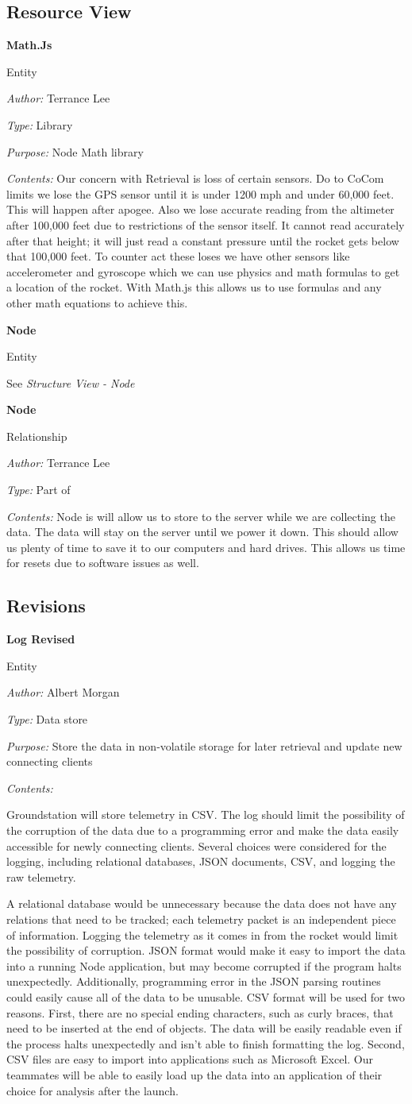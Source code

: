 \documentclass[10pt,draftclsnofoot,onecolumn]{IEEEtran}
\newcommand{\newentity}[5]{

	\noindent\textbf{#2}
	
	\noindent Entity
	
	\noindent\textit{Author:} {#1}
		
	\noindent\textit{Type:} {#3}
	
	\noindent\textit{Purpose:} {#4}

	\noindent\textit{Contents:} {#5}
	\vspace{.5cm}

}
\newcommand{\newrelationship}[4]{
	\noindent\textbf{#2}
	
	\noindent Relationship
	
	\noindent\textit{Author:} #1

	\noindent\textit{Type:} #3

	\noindent\textit{Contents:} #4

	\vspace{.5cm}
}
\newcommand{\entityref}[2]{

	\noindent\textbf{#1}
	
	\noindent Entity
	
	\noindent See \textit{#2}

	\vspace{.5cm}
}
\begin{document}
	\subsection{Resource View}
    
     
   \newentity
	{Terrance Lee}
	{Math.Js}
	{Library}
	{Node Math library}
	{Our concern with Retrieval is loss of certain sensors.  Do to CoCom limits we lose the GPS sensor until it is under 1200 mph and under 60,000 feet. This will happen after apogee.  Also we lose accurate reading from the altimeter after 100,000 feet due to restrictions of the sensor itself.  It cannot read accurately after that height; it will just read a constant pressure until the rocket gets below that 100,000 feet. To counter act these loses we have other sensors like accelerometer and gyroscope which we can use physics and math formulas to get a location of the rocket.  With Math.js this allows us to use formulas and any other math equations to achieve this. }
     \entityref{Node}
	{Structure View - Node}
    
    \newrelationship
	{Terrance Lee}
	{Node}
	{Part of}
	{	Node is will allow us to store to the server while we are collecting the data. The data will stay on the server until we power it down.  This should allow us plenty of time to save it to our computers and hard drives.  This allows us time for resets due to software issues as well.  
		}
	
	
	\subsection{Revisions}


	\newentity
	{Albert Morgan}
	{Log Revised}
	{Data store}
	{Store the data in non-volatile storage for later retrieval and update new connecting clients}
	{
		Groundstation will store telemetry in CSV.
		The log should limit the possibility of the corruption of the data due to a programming error
		and make the data easily accessible for newly connecting clients.
		Several choices were considered for the logging, including relational databases, JSON documents, CSV, and logging the raw telemetry.
		
		A relational database would be unnecessary because the data does not have any relations that need to be tracked;
		each telemetry packet is an independent piece of information.
		Logging the telemetry as it comes in from the rocket would limit the possibility of corruption.
		JSON format would make it easy to import the data into a running Node application, but may become corrupted if the program halts
		unexpectedly.
		Additionally, programming error in the JSON parsing routines could easily cause all of the data to be unusable.
		CSV format will be used for two reasons.
		First, there are no special ending characters, such as curly braces, that need to be inserted at the end of objects.
		The data will be easily readable even if the process halts unexpectedly and isn't able to finish formatting the log.
		Second, CSV files are easy to import into applications such as Microsoft Excel.
		Our teammates will be able to easily load up the data into an application of their choice for analysis after the launch.

	}
\end{document}
